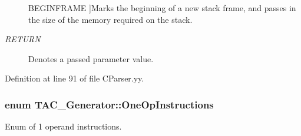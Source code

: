 \begin{Desc}
\begin{description}
{\hypertarget{classTAC__Generator_ab58b7044cb5d16a454f4e01514175123a2900d0c97873b8e4282491148b366771}{B\-E\-G\-I\-N\-F\-R\-A\-M\-E}\label{classTAC__Generator_ab58b7044cb5d16a454f4e01514175123a2900d0c97873b8e4282491148b366771}
}]Marks the beginning of a new stack frame, and passes in the size of the memory required on the stack. \item[{\em 
\hypertarget{classTAC__Generator_ab58b7044cb5d16a454f4e01514175123a0e868fa94bac0750a62dfa98d0f56510}{R\-E\-T\-U\-R\-N}\label{classTAC__Generator_ab58b7044cb5d16a454f4e01514175123a0e868fa94bac0750a62dfa98d0f56510}
}]Denotes a passed parameter value. \end{description}
\end{Desc}


Definition at line 91 of file C\-Parser.\-yy.

\hypertarget{classTAC__Generator_ab58b7044cb5d16a454f4e01514175123}{
\subsubsection[{One\-Op\-Instructions}]{\setlength{\rightskip}{0pt plus 5cm}enum {\bf T\-A\-C\-\_\-\-Generator\-::\-One\-Op\-Instructions}}}\label{classTAC__Generator_ab58b7044cb5d16a454f4e01514175123}


Enum of 1 operand instructions. 


